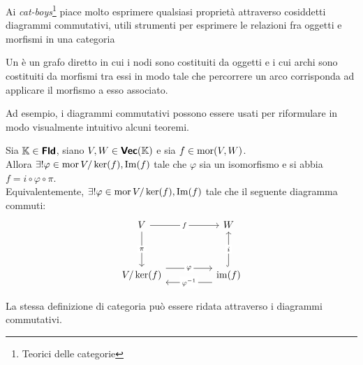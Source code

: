 \documentclass{article}
\begin{document}
Ai \textit{cat-boys}\footnote{Teorici delle categorie} piace molto esprimere qualsiasi proprietà attraverso cosiddetti diagrammi commutativi, utili strumenti per esprimere le relazioni fra oggetti e morfismi in una categoria

\begin{definition}
    Un  è un grafo diretto in cui i nodi sono costituiti da oggetti e i cui archi sono costituiti da morfismi tra essi in modo tale che percorrere un arco corrisponda ad applicare il morfismo a esso associato. 
\end{definition}

Ad esempio, i diagrammi commutativi possono essere usati per riformulare in modo visualmente intuitivo alcuni teoremi.

\begin{theorem}
    Sia $\mathbb{K} \in \text{\sffamily\textbf{Fld}}$, siano $V,W \in \text{\sffamily\textbf{Vec}}(\mathbb{K})$ e sia $f \in \operatorname{mor}(V,W)$.\\
    Allora $\exists! \varphi \in \operatorname{mor}{V/\ker(f), \operatorname{Im}(f)}$ tale che $\varphi$ sia un isomorfismo e si abbia $f = i \circ \varphi \circ \pi$.\\
    Equivalentemente, $\exists! \varphi \in \operatorname{mor}{V/\ker(f), \operatorname{Im}(f)}$ tale che il seguente diagramma commuti:
    \[\begin{tikzcd}
        V && W \\
        \\
        {V/\ker(f)} && {\operatorname{im}(f)}
        \arrow["f"{description}, from=1-1, to=1-3]
        \arrow["\pi"{description}, from=1-1, to=3-1]
        \arrow["\varphi"{description}, shift left=3, from=3-1, to=3-3]
        \arrow["i"{description}, hook, from=3-3, to=1-3]
        \arrow["{\varphi^{-1}}"{description}, shift left=3, from=3-3, to=3-1]
    \end{tikzcd}\]
\end{theorem}

La stessa definizione di categoria può essere ridata attraverso i diagrammi commutativi.
\end{document}
